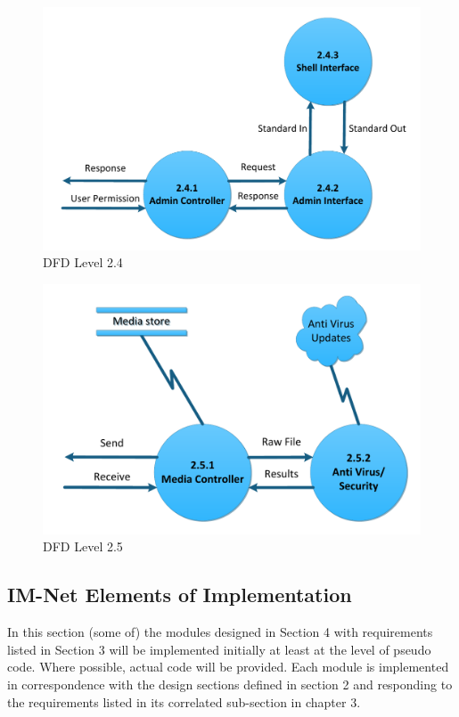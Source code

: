 \documentclass[letterpaper,12pt]{article}
\newcommand{\Section}[1]{\section{#1} \setcounter{figure}{0}}
\begin{document}
{\eject

\begin{figure}[h]
\centering
\includegraphics[scale=0.7]{DFD_level_2_4.pdf}
\caption{DFD Level 2.4}
\label{fig:DFD_level_2.4}
\end{figure}

\eject

\begin{figure}[h]
\centering
\includegraphics[scale=0.7]{DFD_level_2_5.pdf}
\caption{DFD Level 2.5}
\label{fig:DFD_level_2.5}
\end{figure}

\eject
 
\textcolor{section}{\Section{IM-Net Elements of Implementation}}

In this section (some of) the modules designed in Section 4 with requirements listed in Section 3 will be implemented initially at least at the level of pseudo code. Where possible, actual code will be provided. Each module is implemented in correspondence with the design sections defined in section 2 and responding to the requirements listed in its correlated sub-section in chapter 3.

}
\end{document}
